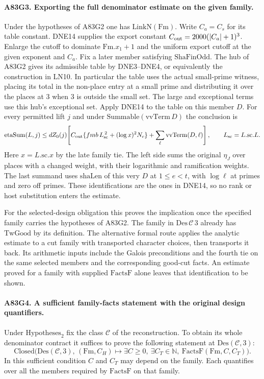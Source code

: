 \paragraph{A83G3. Exporting the full denominator estimate on the given family.}
Under the hypotheses of A83G2 one has $\mathrm{LinkN}(\mathrm{Fm})$.
Write $C_a=C_s$ for its table constant. DNE14 supplies the
export constant $C_{\rm out}=2000(|C_a|+1)^3$. Enlarge the cutoff
to dominate $\mathrm{Fm}.x_1+1$ and the uniform export cutoff at
the given exponent and $C_a$. Fix a later member satisfying
$\mathrm{ShaFinOdd}$. The hub of A83G2 gives its admissible
table by DNE3--DNE4, or equivalently the construction in LN10.
In particular the table uses the actual small-prime witness,
placing its total in the non-place entry at a small prime and
distributing it over the places at $3$ when $3$ is outside the
small set. The large and exceptional terms use this hub's
exceptional set. Apply DNE14 to the table on this member $D$.
For every permitted lift $j$ and under $\mathrm{Summable}
(\mathrm{vvTerm}\,D)$ the conclusion is
\[
 \mathrm{etaSum}(L,j)\le dZ_0(j)\!
 \left[C_{\rm out}\{fm b\,L_{\rm sc}^{\,2}
       +(\log x)^2 N_c\}+\sum_{\ell}\mathrm{vvTerm}(D,\ell)\right],
 \qquad L_{\rm sc}=L.\mathrm{sc}.L .
\]
Here $x=L.\mathrm{sc}.x$ by the late family tie. The left
side sums the original $\eta_J$ over places with a changed
weight, with their logarithmic and ramification weights. The
last summand uses $\mathrm{shaLen}$ of this very $D$ at
$1\le e<t$, with $\log\ell$ at primes and zero off primes.
These identifications are the ones in DNE14, so no rank or
host substitution enters the estimate.

For the selected-design obligation this proves the implication
once the specified family carries the hypotheses of A83G2.
The family in $\mathrm{Des}\,\mathcal C\,3$ already has
$\mathrm{TwGood}$ by its definition. The alternative formal
route applies the analytic estimate to a cut family with
transported character choices, then transports it back. Its
arithmetic inputs include the Galois preconditions and the
fourth tie on the same selected members and the corresponding
good-cut facts. An estimate proved for a family with supplied
$\mathrm{FactsF}$ alone leaves that identification to be shown.

\paragraph{A83G4. A sufficient family-facts statement with the original design quantifiers.}
Under $\mathrm{Hypotheses}_2$ fix the class $\mathcal C$ of the
reconstruction. To obtain its whole denominator contract it suffices to
prove the following statement at $\mathrm{Des}(\mathcal C,3)$:
\[
 \mathrm{Closed}\bigl(\mathrm{Des}(\mathcal C,3),\,
   (\mathrm{Fm},C_H)\mapsto
   \exists C\ge0,\ \exists C_T\in\mathbb N,\
   \mathrm{FactsF}(\mathrm{Fm},C,C_T)\bigr).
\]
In this sufficient condition $C$ and $C_T$ may depend on the
family. Each quantifies over all the members required by
$\mathrm{FactsF}$ on that family.

